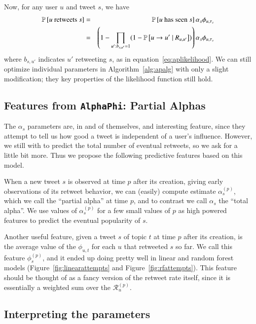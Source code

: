 Now, for any user $u$ and tweet $s$, we have
\begin{eqnarray}
  \mathbb{P} \left[\mbox{$u$ retweets $s$}\right] &=& \mathbb{P} \left[\mbox{$u$ has seen $s$}\right]\alpha_s\phi_{u,\tau_s}\nonumber\\
  &=&\left(1-\prod_{u':b_{s,u'}=1}(1-\mathbb{P} \left[u\to u'~|~R_{u,u'}\right])\right)\alpha_s\phi_{u,\tau_s} \label{eq:apeqfinal}
\end{eqnarray}
where $b_{s,u'}$ indicates $u'$ retweeting $s$, as in equation~\eqref{eq:aplikelihood}.  
We can still optimize individual parameters in Algorithm~\ref{alg:apalg} with only a slight modification; they key properties of the likelihood function still hold.  

\subsection{Features from \texttt{AlphaPhi}: Partial Alphas}

The $\alpha_s$ parameters are, in and of themselves, and interesting feature, since they attempt to tell us how good a tweet is independent of a user's influence.  However, we still with to predict the total number of eventual retweets, so we ask for a little bit more.  
Thus we propose the following predictive features based on this model.     

\label{sec:apfeature}

When a new tweet $s$ is observed at time $p$ after its creation, giving early observations of its retweet behavior, we can (easily) compute estimate $\alpha_s^{(p)}$, which we call the ``partial alpha'' at time $p$, and to contrast we call $\alpha_s$ the ``total alpha''.  
We use values of $\alpha_s^{(p)}$ for a few small values of $p$ as high powered features to predict the eventual popularity of $s$.

Another useful feature, given a tweet $s$ of topic $t$ at time $p$ after its creation, is the average value of the $\phi_{u,t}$ for each $u$ that retweeted $s$ so far.
We call this feature $\phi_s^{(p)}$, and it ended up doing pretty well in linear and random forest models (Figure~\ref{fig:linearattempts} and Figure~\ref{fig:rfattempts}).  This feature should be thought of as a fancy version of the retweet rate itself, since it is essentially a weighted sum over the $\mathcal{R}_u^{(p)}$.  

\subsection{Interpreting the parameters}


